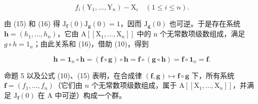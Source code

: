 \[
f _ {i} (\mathrm{Y} _ {1}, \dots , \mathrm{Y} _ {n}) - \mathrm{X} _ {i} \quad (1 \leqslant i \leqslant n).
\]

由 (15) 和 (16) 得 \(\mathrm{J}_{\mathbf{f}}(0)\mathrm{J}_{\mathbf{g}}(0)=1\)，因而 \(\mathrm{J}_{\mathbf{g}}(0)\) 也可逆。于是存在系统 \(\mathbf{h}=(h_{1},\ldots,h_{n})\)，它由 \(\mathrm{A}[[\mathrm{X}_{1},\ldots,\mathrm{X}_{n}]]\) 中的 n 个无常数项级数组成，满足 \(g\circ h=1_{n}\)；由此关系和 (16)，借助 (10)，得到

\[
\mathbf {h} = \mathbf {1} _ {n} \circ \mathbf {h} = (\mathbf {f} \circ \mathbf {g}) \circ \mathbf {h} = \mathbf {f} \circ (\mathbf {g} \circ \mathbf {h}) = \mathbf {f} \circ \mathbf {1} _ {n} = \mathbf {f}.
\]

命题 5 以及公式 (10)、(15) 表明，在合成律 \((\mathbf{f},\mathbf{g})\mapsto \mathbf{f}\circ \mathbf{g}\) 下，所有系统 \(\mathbf{f} = (f_1,\dots ,f_n)\)（它们由 \(n\) 个无常数项级数组成，属于 \(\mathrm{A}[[\mathrm{X}_1,\dots ,\mathrm{X}_n]]\)，并满足 \(\mathrm{J}_{\mathbf{f}}(0)\) 在 A 中可逆）构成一个群。

